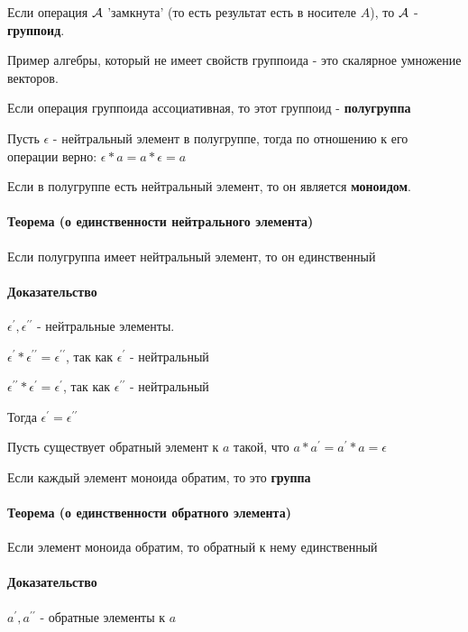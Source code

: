 \documentclass{report}
\begin{document}
Если операция $\cal A$ 'замкнута' (то есть результат есть в носителе $A$), то $\cal A$ - \textbf{группоид}.

Пример алгебры, который не имеет свойств группоида - это скалярное умножение векторов.

\medskip

Если операция группоида ассоциативная, то этот группоид - \textbf{полугруппа}

\medskip

Пусть $\epsilon$ - нейтральный элемент в полугруппе,
тогда по отношению к его операции верно:
$\epsilon * a = a * \epsilon = a$

Если в полугруппе есть нейтральный элемент, то он является \textbf{моноидом}.

\medskip

\paragraph*{Теорема (о единственности нейтрального элемента)}
Если полугруппа имеет нейтральный элемент, то он единственный
\paragraph*{Доказательство}
$\epsilon^{\prime}, \epsilon^{\prime\prime}$ - нейтральные элементы.

$\epsilon^{\prime} * \epsilon^{\prime\prime} = \epsilon^{\prime\prime}$, так как $\epsilon^{\prime}$ - нейтральный

$\epsilon^{\prime\prime} * \epsilon^{\prime} = \epsilon^{\prime}$, так как $\epsilon^{\prime\prime}$ - нейтральный

Тогда $\epsilon^{\prime} = \epsilon^{\prime\prime}$

\medskip

Пусть существует обратный элемент к $a$ такой, что $a * a^{\prime} = a^{\prime} * a = \epsilon$

Если каждый элемент моноида обратим, то это {\bf группа}

\paragraph*{Теорема (о единственности обратного элемента)}
Если элемент моноида обратим, то обратный к нему единственный
\paragraph*{Доказательство}
$a^{\prime}, a^{\prime\prime}$ - обратные элементы к $a$
\end{document}
